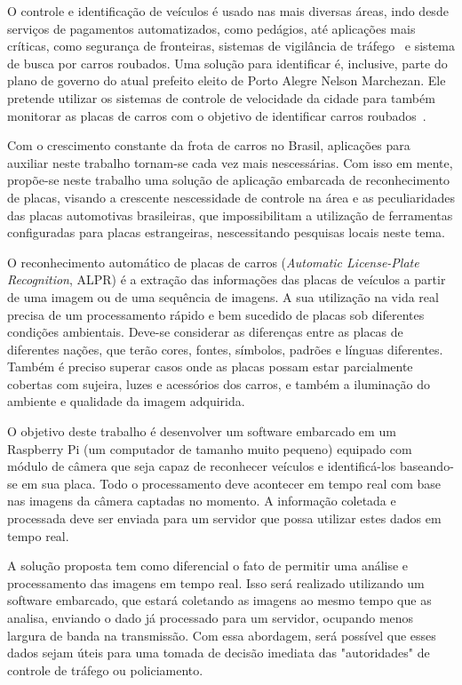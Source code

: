 O controle e identificação de veículos é usado nas mais diversas áreas, indo
desde serviços de pagamentos automatizados, como pedágios, até aplicações mais
críticas, como segurança de fronteiras, sistemas de vigilância de
tráfego~\cite{ahmad2015automatic} e sistema de busca por carros roubados.
Uma solução para identificar é, inclusive,  parte do plano de governo do atual prefeito eleito de Porto Alegre
Nelson Marchezan. Ele pretende utilizar os sistemas de controle de velocidade da cidade para também
monitorar as placas de carros com o objetivo de identificar carros roubados~\cite{psdb2016marchezan}.

Com o crescimento constante da frota de carros no Brasil, aplicações para
auxiliar neste trabalho tornam-se cada vez
mais nescessárias. Com isso em mente, propõe-se neste trabalho uma solução de
aplicação embarcada de reconhecimento de placas, visando a
crescente nescessidade de controle na área e as peculiaridades das placas
automotivas brasileiras, que impossibilitam a utilização de ferramentas
configuradas para placas estrangeiras, nescessitando pesquisas locais neste
tema.

O reconhecimento automático de placas de carros (\emph{Automatic License-Plate
Recognition}, ALPR) é a extração das informações das placas de veículos a partir
de uma imagem ou de uma sequência de imagens. A sua utilização na vida real
precisa de um processamento rápido e bem sucedido de placas sob diferentes
condições ambientais. Deve-se considerar as diferenças entre as placas de
diferentes nações, que terão cores, fontes, símbolos, padrões e línguas
diferentes. Também é preciso superar casos onde as placas possam estar
parcialmente cobertas com sujeira, luzes e acessórios dos
carros, e também a iluminação do ambiente e qualidade
da imagem adquirida.~\cite{s2013automatic}

O objetivo deste trabalho é desenvolver um software embarcado em um Raspberry Pi
(um computador de tamanho muito pequeno) equipado com módulo de câmera que seja
capaz de reconhecer veículos e identificá-los baseando-se em sua
placa. Todo o processamento deve acontecer em tempo real com base nas imagens da
câmera captadas no momento. A informação coletada e processada deve ser enviada
para um servidor que possa utilizar estes dados em tempo real.

A solução proposta tem como diferencial o fato de permitir uma
análise e processamento das imagens em tempo real. Isso será realizado
utilizando um software embarcado, que estará coletando as imagens ao mesmo tempo
que as analisa, enviando o dado já processado para um servidor, ocupando menos
largura de banda na transmissão. Com essa abordagem, será possível que esses
dados sejam úteis para uma tomada de decisão imediata das "autoridades" de
controle de tráfego ou policiamento.

